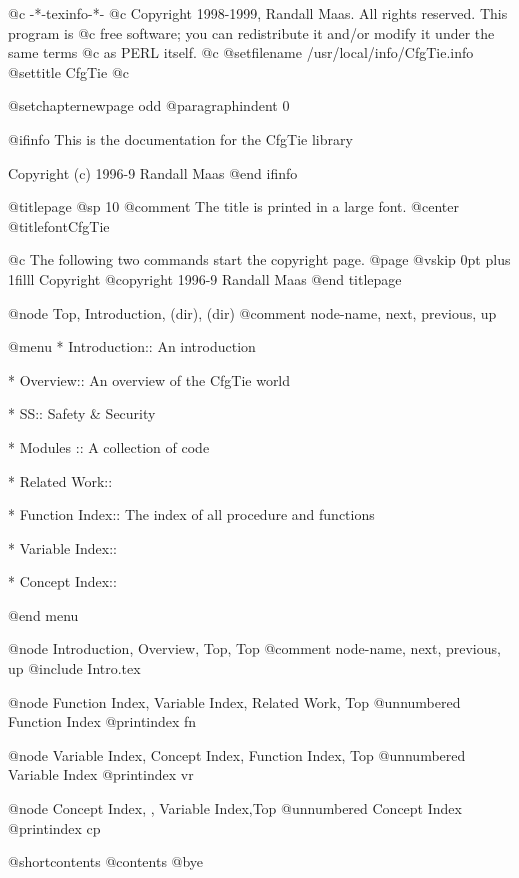    @c -*-texinfo-*-
@c Copyright 1998-1999, Randall Maas.  All rights reserved.  This program is
@c free software; you can redistribute it and/or modify it under the same terms
@c as PERL itself.                                                                   
@c %
@setfilename /usr/local/info/CfgTie.info
@settitle CfgTie
@c %

@setchapternewpage odd
@paragraphindent 0

@ifinfo
This is the documentation for the CfgTie library

Copyright (c) 1996-9 Randall Maas
@end ifinfo

@titlepage
@sp 10
@comment The title is printed in a large font.
@center @titlefont{CfgTie}

@c The following two commands start the copyright page.
@page
@vskip 0pt plus 1filll
Copyright @copyright{} 1996-9 Randall Maas
@end titlepage

@node    Top,       Introduction,  (dir),    (dir)
@comment node-name, next,          previous, up

@menu
* Introduction::           An introduction

* Overview::		   An overview of the CfgTie world

* SS::			   Safety & Security

* Modules ::               A collection of code

* Related Work::

* Function Index::         The index of all procedure and functions

* Variable Index::

* Concept Index::

@end menu

@node    Introduction, Overview, Top,      Top
@comment node-name,    next,                  previous, up
@include Intro.tex

@node Function Index, Variable Index, Related Work, Top
@unnumbered Function Index
@printindex fn

@node Variable Index, Concept Index, Function Index, Top
@unnumbered Variable Index
@printindex vr

@node Concept Index, , Variable Index,Top
@unnumbered Concept Index
@printindex cp


@shortcontents
@contents
@bye

